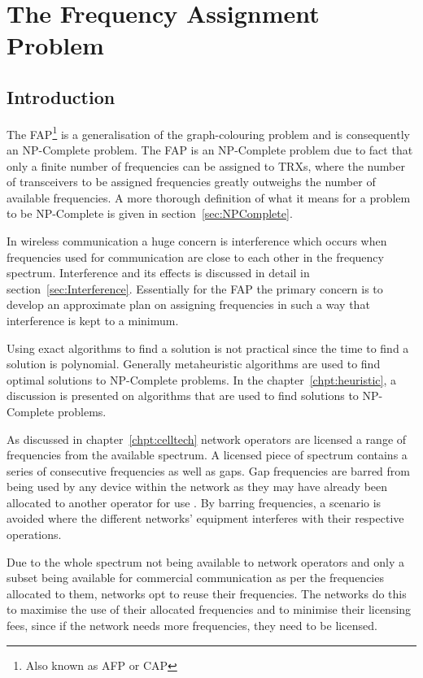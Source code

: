 \chapter{The Frequency Assignment Problem}
\label{chpt:fap}
\section{Introduction}
The \gls{FAP}\footnote{Also known as \gls{AFP} or \gls{CAP}\cite{ACOvsEA}} is a generalisation of the graph-colouring problem and is consequently an NP-Complete problem\cite{FAPRAMColouring}. The \gls{FAP} is an NP-Complete problem due to fact that only a finite number of frequencies can be assigned to \glspl{TRX}, where the number of transceivers to be assigned frequencies greatly outweighs the number of available frequencies\cite{FAPRAMColouring}. A more thorough definition of what it means for a problem to be NP-Complete is given in section~\ref{sec:NPComplete}.

In wireless communication a huge concern is interference which occurs when frequencies used for communication are close to each other in the frequency spectrum\cite{Karen2004}. Interference and its effects is discussed in detail in section~\ref{sec:Interference}. Essentially for the \gls{FAP} the primary concern is to develop an approximate plan on assigning frequencies in such a way that interference is kept to a minimum. 

Using exact algorithms to find a solution is not practical since the time to find a solution is polynomial. Generally metaheuristic algorithms are used to find optimal solutions to NP-Complete problems\cite{ACOvsEA}. In the chapter~\ref{chpt:heuristic}, a discussion is presented on algorithms that are used to find solutions to NP-Complete problems. 

As discussed in chapter~\ref{chpt:celltech} network operators are licensed a range of frequencies from the available spectrum. A licensed piece of spectrum contains a series of consecutive frequencies as well as gaps. Gap frequencies are barred from being used by any device within the network as they may have already been allocated to another operator for use \cite{FAPInCell}. By barring frequencies, a scenario is avoided where the different networks' equipment interferes with their respective operations\cite{FAPInCell}.

Due to the whole spectrum not being available to network operators and only a subset being available for commercial communication as per the frequencies allocated to them, networks opt to reuse their frequencies\cite{FAPInCell}. The networks do this to maximise the use of their allocated frequencies and to minimise their licensing fees, since if the network needs more frequencies, they need to be licensed\cite{FAPRAMColouring}.

